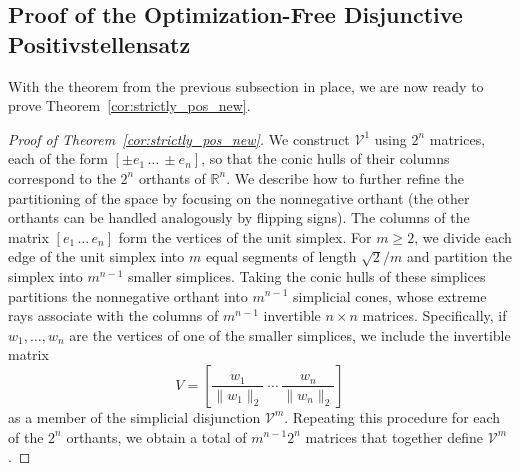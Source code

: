 \documentclass[12pt]{article}
\newcommand{\reals}{\mathbb{R}}
\newcommand{\mcV}{\mathcal{V}}
\theoremstyle{remark}
\begin{document}
\subsection{Proof of the Optimization-Free Disjunctive Positivstellensatz}

With the theorem from the previous subsection in place, we are now ready to prove Theorem~\ref{cor:strictly_pos_new}.
\begin{proof}[Proof of Theorem~\ref{cor:strictly_pos_new}]
We construct 
$\mcV^{1}$ using $2^n$ matrices, each of the form $\left[\pm e_1\, \ldots\, \pm e_n\right]$, so that the conic hulls of their columns correspond to the $2^n$ orthants of $\reals^n$. We describe how to further refine the partitioning of the space by focusing on the nonnegative orthant (the other orthants can be handled analogously by flipping signs). 
The columns of the matrix $\left[e_1\, \ldots\,  e_n\right]$ form the vertices of the unit simplex. 
For $m\ge 2$, we divide each edge of the unit simplex into $m$ equal segments of length $\sqrt{2}/m$ and partition the simplex into $m^{n-1}$ smaller simplices. Taking the conic hulls of these simplices partitions the nonnegative orthant into $m^{n-1}$ simplicial cones, whose extreme rays associate with the columns of $m^{n-1}$ invertible $n\times n$ matrices. Specifically, if $w_1,\ldots,w_n$ are the vertices of one of the smaller simplices, we include the invertible matrix 
$$V=\left[\frac{w_1}{\|w_1\|_2} \ \cdots\ \frac{w_n}{\|w_n\|_2}\right]$$
as a member of the simplicial disjunction $\mcV^m$. Repeating this procedure for each of the $2^n$ orthants, we obtain a total of $m^{n-1}2^n$ matrices that together define $\mcV^m$.


\end{proof}
\end{document}
